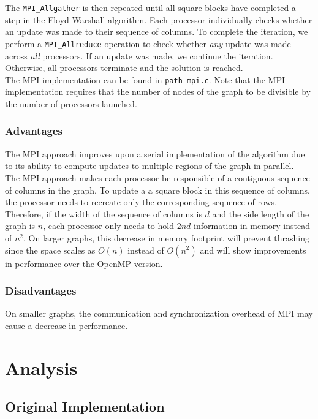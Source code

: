 \documentclass[11pt]{article}
\begin{document}
The \texttt{MPI\_Allgather} is then repeated until all square blocks have completed a step in the Floyd-Warshall algorithm. Each processor individually checks whether an update was made to their sequence of columns. To complete the iteration, we perform a \texttt{MPI\_Allreduce} operation to check whether \textit{any} update was made across \textit{all} processors. If an update was made, we continue the iteration. Otherwise, all processors terminate and the solution is reached. \\

The MPI implementation can be found in \texttt{path-mpi.c}. Note that the MPI implementation requires that the number of nodes of the graph to be divisible by the number of processors launched. 

\subsubsection{Advantages}

The MPI approach improves upon a serial implementation of the algorithm due to its ability to compute updates to multiple regions of the graph in parallel. \\
 
The MPI approach makes each processor be responsible of a contiguous sequence of columns in the graph. To update a a square block in this sequence of columns, the processor needs to recreate only the corresponding sequence of rows. Therefore, if the width of the sequence of columns is $d$ and the side length of the graph is $n$, each processor only needs to hold $2nd$ information in memory instead of $n^2$. On larger graphs, this decrease in memory footprint will prevent thrashing since the space scales as $O(n)$ instead of $O(n^2)$ and will show improvements in performance over the OpenMP version. 

\subsubsection{Disadvantages}
On smaller graphs, the communication and synchronization overhead  of MPI may cause a decrease in performance.

\section{Analysis}

\subsection{Original Implementation}
\end{document}
